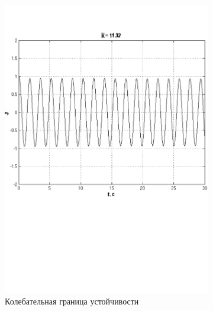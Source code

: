 \documentclass[a4paper, 11pt, russian]{article}
\begin{document}
\begin{figure}[ht!]
        \begin{subfigure}[b]{0.49\textwidth}
            \includegraphics[width = \textwidth]{oscillatoryStabilityLimit}
            \centering
            \caption{Колебательная граница устойчивости}
        \end{subfigure}
        \hfill
        \begin{subfigure}[b]{0.49\textwidth}

\end{subfigure}
\end{figure}
\end{document}
